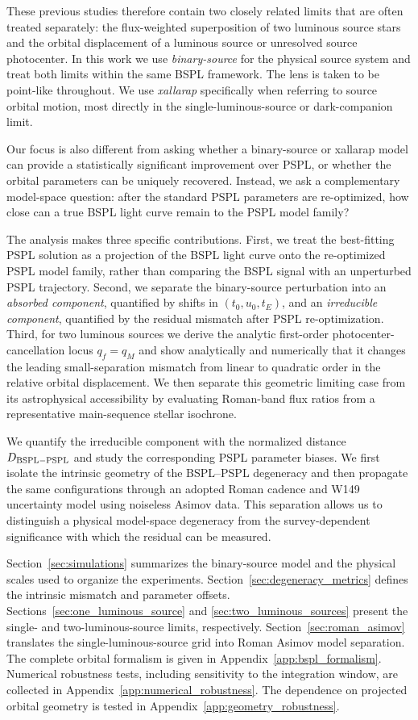 \documentclass{article}
\begin{document}
These previous studies therefore contain two closely related limits that
are often treated separately: the flux-weighted superposition of two
luminous source stars and the orbital displacement of a luminous source
or unresolved source photocenter. In this work we use
\emph{binary-source} for the physical source system and treat both
limits within the same BSPL framework. The lens is taken to be
point-like throughout. We use \emph{xallarap} specifically when
referring to source orbital motion, most directly in the
single-luminous-source or dark-companion limit.

Our focus is also different from asking whether a binary-source or
xallarap model can provide a statistically significant improvement over
PSPL, or whether the orbital parameters can be uniquely recovered.
Instead, we ask a complementary model-space question: after the standard
PSPL parameters are re-optimized, how close can a true BSPL light curve
remain to the PSPL model family?

The analysis makes three specific contributions. First, we treat the
best-fitting PSPL solution as a projection of the BSPL light curve onto
the re-optimized PSPL model family, rather than comparing the BSPL signal
with an unperturbed PSPL trajectory. Second, we separate the
binary-source perturbation into an \emph{absorbed component}, quantified
by shifts in $(t_0,u_0,t_E)$, and an \emph{irreducible component},
quantified by the residual mismatch after PSPL re-optimization. Third,
for two luminous sources we derive the analytic first-order
photocenter-cancellation locus $q_f=q_M$ and show analytically and
numerically that it changes the leading small-separation mismatch from
linear to quadratic order in the relative orbital displacement. We then
separate this geometric limiting case from its astrophysical accessibility
by evaluating Roman-band flux ratios from a representative main-sequence
stellar isochrone.

We quantify the irreducible component with the normalized distance
$D_{\rm BSPL-PSPL}$ and study the corresponding PSPL parameter biases.
We first isolate the intrinsic geometry of the BSPL--PSPL degeneracy and
then propagate the same configurations through an adopted Roman cadence
and W149 uncertainty model using noiseless Asimov data. This separation
allows us to distinguish a physical model-space degeneracy from the
survey-dependent significance with which the residual can be measured.

Section~\ref{sec:simulations} summarizes the binary-source model and the
physical scales used to organize the experiments.
Section~\ref{sec:degeneracy_metrics} defines the intrinsic mismatch and
parameter offsets. Sections~\ref{sec:one_luminous_source} and
\ref{sec:two_luminous_sources} present the single- and two-luminous-source
limits, respectively. Section~\ref{sec:roman_asimov} translates the
single-luminous-source grid into Roman Asimov model separation. The
complete orbital formalism is given in Appendix~\ref{app:bspl_formalism}.
Numerical robustness tests, including sensitivity to the integration
window, are collected in Appendix~\ref{app:numerical_robustness}.
The dependence on projected orbital geometry is tested in
Appendix~\ref{app:geometry_robustness}.
\end{document}
